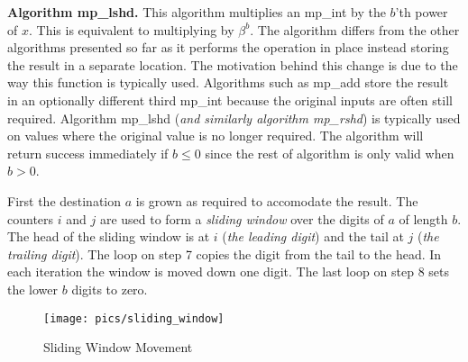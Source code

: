\documentclass[b5paper]{book}
\begin{document}
\textbf{Algorithm mp\_lshd.}
This algorithm multiplies an mp\_int by the $b$'th power of $x$.  This is equivalent to multiplying by $\beta^b$.  The algorithm differs 
from the other algorithms presented so far as it performs the operation in place instead storing the result in a separate location.  The
motivation behind this change is due to the way this function is typically used.  Algorithms such as mp\_add store the result in an optionally
different third mp\_int because the original inputs are often still required.  Algorithm mp\_lshd (\textit{and similarly algorithm mp\_rshd}) is
typically used on values where the original value is no longer required.  The algorithm will return success immediately if 
$b \le 0$ since the rest of algorithm is only valid when $b > 0$.  

First the destination $a$ is grown as required to accomodate the result.  The counters $i$ and $j$ are used to form a \textit{sliding window} over
the digits of $a$ of length $b$.  The head of the sliding window is at $i$ (\textit{the leading digit}) and the tail at $j$ (\textit{the trailing digit}).  
The loop on step 7 copies the digit from the tail to the head.  In each iteration the window is moved down one digit.   The last loop on 
step 8 sets the lower $b$ digits to zero.

\newpage
\begin{center}
\begin{figure}[here]
\texttt{[image: pics/sliding\_window]}
\caption{Sliding Window Movement}
\label{pic:sliding_window}
\end{figure}
\end{center}
\end{document}
